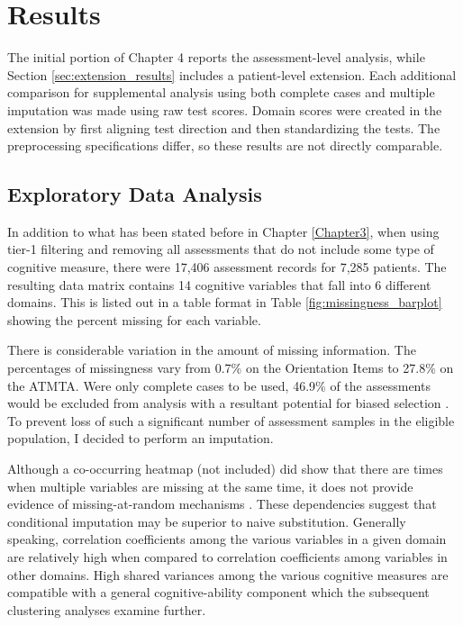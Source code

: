 
\chapter{Results}\label{Chapter4}

The initial portion of Chapter 4 reports the assessment-level analysis, while Section \ref{sec:extension_results} includes a patient-level extension. Each additional comparison for supplemental analysis using both complete cases and multiple imputation was made using raw test scores. Domain scores were created in the extension by first aligning test direction and then standardizing the tests. The preprocessing specifications differ, so these results are not directly comparable.


\section{Exploratory Data Analysis}
In addition to what has been stated before in Chapter \ref{Chapter3}, when using tier-1 filtering and removing all assessments that do not include some type of cognitive measure, there were 17,406 assessment records for 7,285 patients. The resulting data matrix contains 14 cognitive variables that fall into 6 different domains. This is listed out in a table format in Table \ref{fig:missingness_barplot} showing the percent missing for each variable.

There is considerable variation in the amount of missing information. The percentages of missingness vary from 0.7\% on the Orientation Items to 27.8\% on the ATMTA. Were only complete cases to be used, 46.9\% of the assessments would be excluded from analysis with a resultant potential for biased selection \parencite{rubin1976inference}. To prevent loss of such a significant number of assessment samples in the eligible population, I decided to perform an imputation.

Although a co-occurring heatmap (not included) did show that there are times when multiple variables are missing at the same time, it does not provide evidence of missing-at-random mechanisms \parencite{rubin1976inference,little2019statistical}. These dependencies suggest that conditional imputation may be superior to naive substitution. Generally speaking, correlation coefficients among the various variables in a given domain are relatively high when compared to correlation coefficients among variables in other domains. High shared variances among the various cognitive measures are compatible with a general cognitive-ability component \parencite{lezak2012neuropsychological} which the subsequent clustering analyses examine further.

